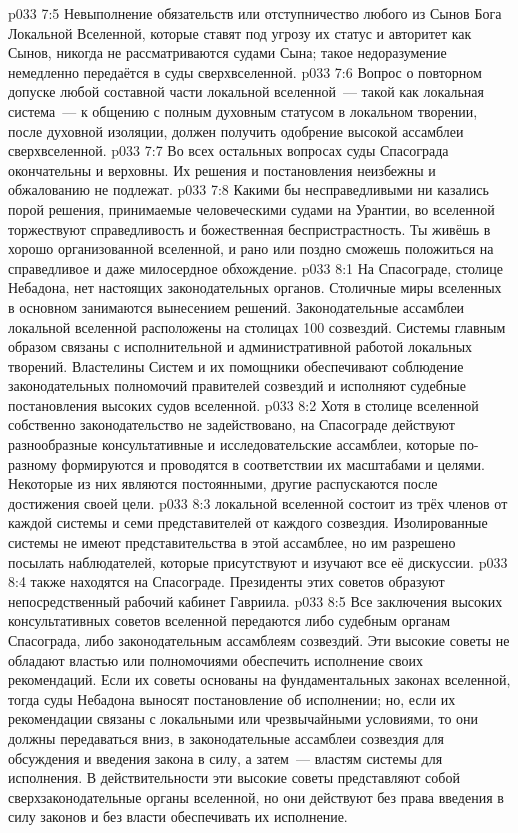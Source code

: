 \vs p033 7:5 Невыполнение обязательств или отступничество любого из Сынов Бога Локальной Вселенной, которые ставят под угрозу их статус и авторитет как Сынов, никогда не рассматриваются судами Сына; такое недоразумение немедленно передаётся в суды сверхвселенной.
\vs p033 7:6 Вопрос о повторном допуске любой составной части локальной вселенной~--- такой как локальная система~--- к общению с полным духовным статусом в локальном творении, после духовной изоляции, должен получить одобрение высокой ассамблеи сверхвселенной.
\vs p033 7:7 \pc Во всех остальных вопросах суды Спасограда окончательны и верховны. Их решения и постановления неизбежны и обжалованию не подлежат.
\vs p033 7:8 Какими бы несправедливыми ни казались порой решения, принимаемые человеческими судами на Урантии, во вселенной торжествуют справедливость и божественная беспристрастность. Ты живёшь в хорошо организованной вселенной, и рано или поздно сможешь положиться на справедливое и даже милосердное обхождение.
\vs p033 8:1 На Спасограде, столице Небадона, нет настоящих законодательных органов. Столичные миры вселенных в основном занимаются вынесением решений. Законодательные ассамблеи локальной вселенной расположены на столицах 100 созвездий. Системы главным образом связаны с исполнительной и административной работой локальных творений. Властелины Систем и их помощники обеспечивают соблюдение законодательных полномочий правителей созвездий и исполняют судебные постановления высоких судов вселенной.
\vs p033 8:2 Хотя в столице вселенной собственно законодательство не задействовано, на Спасограде действуют разнообразные консультативные и исследовательские ассамблеи, которые по\hyp{}разному формируются и проводятся в соответствии их масштабами и целями. Некоторые из них являются постоянными, другие распускаются после достижения своей цели.
\vs p033 8:3 \pc {} локальной вселенной состоит из трёх членов от каждой системы и семи представителей от каждого созвездия. Изолированные системы не имеют представительства в этой ассамблее, но им разрешено посылать наблюдателей, которые присутствуют и изучают все её дискуссии.
\vs p033 8:4 \pc {} также находятся на Спасограде. Президенты этих советов образуют непосредственный рабочий кабинет Гавриила.
\vs p033 8:5 \pc Все заключения высоких консультативных советов вселенной передаются либо судебным органам Спасограда, либо законодательным ассамблеям созвездий. Эти высокие советы не обладают властью или полномочиями обеспечить исполнение своих рекомендаций. Если их советы основаны на фундаментальных законах вселенной, тогда суды Небадона выносят постановление об исполнении; но, если их рекомендации связаны с локальными или чрезвычайными условиями, то они должны передаваться вниз, в законодательные ассамблеи созвездия для обсуждения и введения закона в силу, а затем~--- властям системы для исполнения. В действительности эти высокие советы представляют собой сверхзаконодательные органы вселенной, но они действуют без права введения в силу законов и без власти обеспечивать их исполнение.
